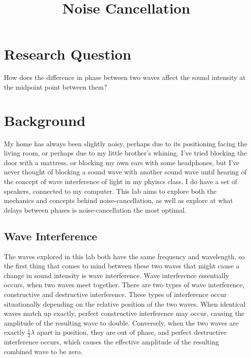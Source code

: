 \documentclass[index]{subfiles}
\begin{document}
\title{Noise Cancellation}
\date{}
\author{}
\maketitle

\section{Research Question}

How does the difference in phase between two waves affect the sound intensity at the midpoint point between them?

\section{Background}

My home has always been slightly noisy, perhaps due to its positioning facing the living room, or perhaps due to my little brother's whining. I've tried blocking the door with a mattress, or blocking my own ears with some headphones, but I've never thought of blocking a sound wave with another sound wave until hearing of the concept of wave interference of light in my phyiscs class. I do have a set of speakers, connected to my computer. This lab aims to explore both the mechanics and concepts behind noise-cancellation, as well as explore at what delays between phases is noise-cancellation the most optimal.

\subsection{Wave Interference}

The waves explored in this lab both have the same frequency and wavelength, so the first thing that comes to mind between these two waves that might cause a change in sound intensity is wave interference.
Wave interference essentially occurs, when two waves meet together. There are two types of wave interference, constructive and destructive interference. These types of interference occur situationally depending on the relative position of the two waves. When identical waves match up exactly, perfect constructive interference may occur, causing the amplitude of the resulting wave to double. Conversely, when the two waves are exactly \(\frac{1}{2}\lambda\) apart in position, they are out of phase, and perfect destructive interference occurs, which causes the effective amplitude of the resulting combined wave to be zero.\cite{openstax}
\end{document}
